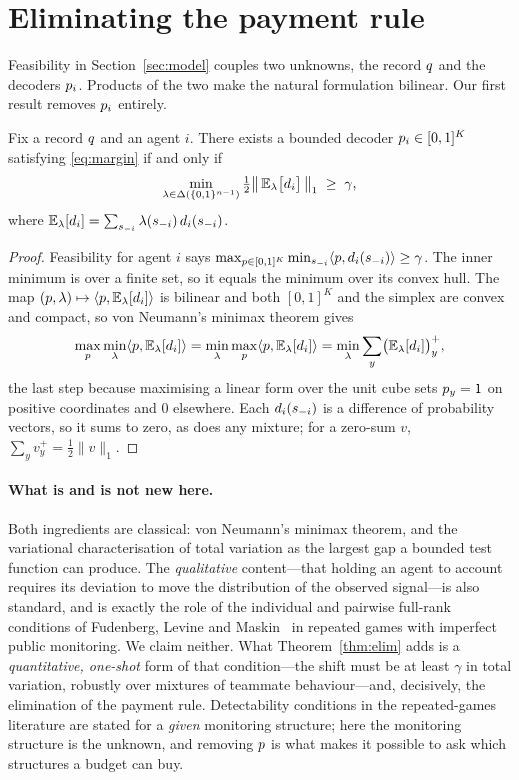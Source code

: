 \section{Eliminating the payment rule}
\label{sec:elimination}

Feasibility in Section~\ref{sec:model} couples two unknowns, the record $q$
and the decoders $p_i$. Products of the two make the natural formulation
bilinear. Our first result removes $p_i$ entirely.

\begin{theorem}
\label{thm:elim}
Fix a record $q$ and an agent $i$. There exists a bounded decoder
$p_i \in [0,1]^K$ satisfying \eqref{eq:margin} if and only if
\[
  \min_{\lambda \in \Delta(\{0,1\}^{n-1})}
  \tfrac{1}{2}\bigl\|\,\mathbb{E}_{\lambda}\bigl[d_i\bigr]\,\bigr\|_1 \;\ge\; \gamma ,
\]
where $\mathbb{E}_\lambda[d_i] = \sum_{s_{-i}} \lambda(s_{-i})\, d_i(s_{-i})$.
\end{theorem}

\begin{proof}
Feasibility for agent $i$ says
$\max_{p \in [0,1]^K} \min_{s_{-i}} \langle p, d_i(s_{-i})\rangle \ge \gamma$.
The inner minimum is over a finite set, so it equals the minimum over its convex
hull. The map $(p,\lambda) \mapsto \langle p, \mathbb{E}_\lambda[d_i]\rangle$ is
bilinear and both $[0,1]^K$ and the simplex are convex and compact, so von
Neumann's minimax theorem gives
\[
  \max_{p} \min_{\lambda} \langle p, \mathbb{E}_\lambda[d_i]\rangle
  = \min_{\lambda} \max_{p} \langle p, \mathbb{E}_\lambda[d_i]\rangle
  = \min_{\lambda} \sum_y \bigl(\mathbb{E}_\lambda[d_i]\bigr)_y^{+},
\]
the last step because maximising a linear form over the unit cube sets
$p_y = 1$ on positive coordinates and $0$ elsewhere. Each $d_i(s_{-i})$ is a
difference of probability vectors, so it sums to zero, as does any mixture; for a
zero-sum $v$, $\sum_y v_y^+ = \tfrac12\|v\|_1$.
\end{proof}

\paragraph{What is and is not new here.}
Both ingredients are classical: von Neumann's minimax theorem, and the
variational characterisation of total variation as the largest gap a bounded test
function can produce. The \emph{qualitative} content---that holding an agent to
account requires its deviation to move the distribution of the observed
signal---is also standard, and is exactly the role of the individual and pairwise
full-rank conditions of Fudenberg, Levine and Maskin~\cite{flm1994} in repeated
games with imperfect public monitoring. We claim neither. What
Theorem~\ref{thm:elim} adds is a \emph{quantitative, one-shot} form of that
condition---the shift must be at least $\gamma$ in total variation, robustly over
mixtures of teammate behaviour---and, decisively, the elimination of the payment
rule. Detectability conditions in the repeated-games literature are stated for a
\emph{given} monitoring structure; here the monitoring structure is the unknown,
and removing $p$ is what makes it possible to ask which structures a budget
can buy.

